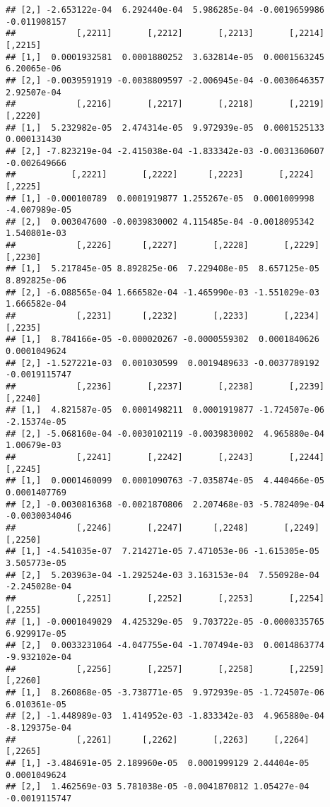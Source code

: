 \documentclass[
]{article}
\begin{document}
\begin{verbatim}
## [2,] -2.653122e-04  6.292440e-04  5.986285e-04 -0.0019659986 -0.011908157
##            [,2211]       [,2212]       [,2213]       [,2214]     [,2215]
## [1,]  0.0001932581  0.0001880252  3.632814e-05  0.0001563245 6.20065e-06
## [2,] -0.0039591919 -0.0038809597 -2.006945e-04 -0.0030646357 2.92507e-04
##            [,2216]       [,2217]       [,2218]       [,2219]      [,2220]
## [1,]  5.232982e-05  2.474314e-05  9.972939e-05  0.0001525133  0.000131430
## [2,] -7.823219e-04 -2.415038e-04 -1.833342e-03 -0.0031360607 -0.002649666
##           [,2221]       [,2222]      [,2223]       [,2224]       [,2225]
## [1,] -0.000100789  0.0001919877 1.255267e-05  0.0001009998 -4.007989e-05
## [2,]  0.003047600 -0.0039830002 4.115485e-04 -0.0018095342  1.540801e-03
##            [,2226]      [,2227]       [,2228]       [,2229]      [,2230]
## [1,]  5.217845e-05 8.892825e-06  7.229408e-05  8.657125e-05 8.892825e-06
## [2,] -6.088565e-04 1.666582e-04 -1.465990e-03 -1.551029e-03 1.666582e-04
##            [,2231]      [,2232]       [,2233]       [,2234]       [,2235]
## [1,]  8.784166e-05 -0.000020267 -0.0000559302  0.0001840626  0.0001049624
## [2,] -1.527221e-03  0.001030599  0.0019489633 -0.0037789192 -0.0019115747
##            [,2236]       [,2237]       [,2238]       [,2239]      [,2240]
## [1,]  4.821587e-05  0.0001498211  0.0001919877 -1.724507e-06 -2.15374e-05
## [2,] -5.068160e-04 -0.0030102119 -0.0039830002  4.965880e-04  1.00679e-03
##            [,2241]       [,2242]       [,2243]       [,2244]       [,2245]
## [1,]  0.0001460099  0.0001090763 -7.035874e-05  4.440466e-05  0.0001407769
## [2,] -0.0030816368 -0.0021870806  2.207468e-03 -5.782409e-04 -0.0030034046
##            [,2246]       [,2247]      [,2248]       [,2249]       [,2250]
## [1,] -4.541035e-07  7.214271e-05 7.471053e-06 -1.615305e-05  3.505773e-05
## [2,]  5.203963e-04 -1.292524e-03 3.163153e-04  7.550928e-04 -2.245028e-04
##            [,2251]       [,2252]       [,2253]       [,2254]       [,2255]
## [1,] -0.0001049029  4.425329e-05  9.703722e-05 -0.0000335765  6.929917e-05
## [2,]  0.0033231064 -4.047755e-04 -1.707494e-03  0.0014863774 -9.932102e-04
##            [,2256]       [,2257]       [,2258]       [,2259]       [,2260]
## [1,]  8.260868e-05 -3.738771e-05  9.972939e-05 -1.724507e-06  6.010361e-05
## [2,] -1.448989e-03  1.414952e-03 -1.833342e-03  4.965880e-04 -8.129375e-04
##            [,2261]      [,2262]       [,2263]     [,2264]       [,2265]
## [1,] -3.484691e-05 2.189960e-05  0.0001999129 2.44404e-05  0.0001049624
## [2,]  1.462569e-03 5.781038e-05 -0.0041870812 1.05427e-04 -0.0019115747

\end{verbatim}
\end{document}
